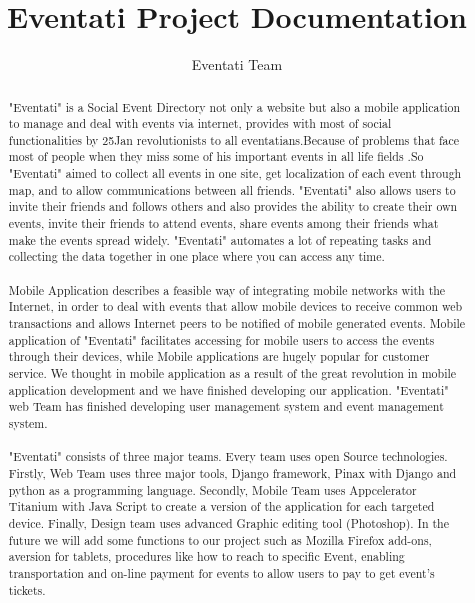 \documentclass[12pt,a4paper,class,twoside,openany]{report}
\author{Eventati Team}
\title{Eventati Project Documentation}
\begin{document}
\begin{abstract}
\paragraph*{\hspace{.9 cm} }
 "Eventati"  is a Social Event Directory not only a website but also a mobile application to manage and deal with events via internet, provides with most of social functionalities by 25Jan revolutionists to all eventatians.Because of  problems that face most of people when they miss some of his important events in all life fields .So "Eventati"  aimed to collect all events in one site, get localization of each event through map, and to allow communications between all friends.
 "Eventati" also allows users to invite their friends and follows others and also provides the ability to create their own events, invite their friends to attend events, share events among their friends what make the events spread widely. "Eventati" automates a lot of repeating tasks and collecting the data together in one place where you can access any time.
 \paragraph*{\hspace{.9 cm} } Mobile Application describes a feasible way of integrating mobile networks with the Internet, in order to deal with events  that  allow mobile devices to receive common web transactions and allows Internet peers to be notified of mobile generated events. Mobile application of "Eventati"  facilitates  accessing for mobile users to access the events through their devices, while Mobile applications are hugely popular for customer service. We thought in mobile application as a result of the great revolution in mobile application development and we have finished developing our application. "Eventati" web Team has finished developing user management system and event management system.
\paragraph*{\hspace{.9 cm} } "Eventati" consists of three major teams. Every team uses open Source technologies. Firstly, Web Team uses three major tools, Django framework, Pinax with Django and python as a programming language. Secondly, Mobile Team uses Appcelerator Titanium with Java Script to create a version of the application for each targeted   device. Finally, Design team uses advanced Graphic editing tool (Photoshop).
In the future we will add some functions to our project such as Mozilla Firefox add-ons, aversion for tablets, procedures like how to reach to specific Event, enabling transportation and on-line payment for events to allow users to pay to get event's tickets.
\end{abstract}
\cleardoublepage
\end{document}
